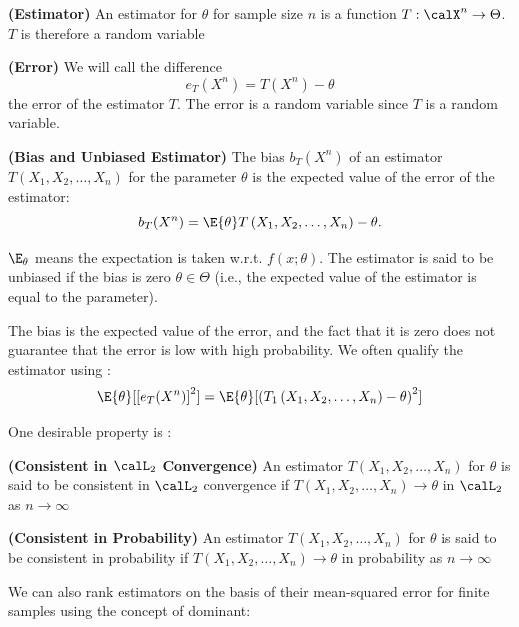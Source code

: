 \documentclass{article}
\newcommand{\bfs}[1]{\textbf{({#1})}}
\begin{document}
\begin{defa}{\bfs{Estimator}}
An estimator for $\theta$ for sample size $n$ is a function $T: \calX^{n} \rightarrow \Theta$. $T$ is therefore a random variable
\end{defa} 

\begin{defa}{\bfs{Error}}
We will call the difference $$e_T(X^n) = T(X^n)-\theta$$ the error of the estimator $T$. The error is a random variable since $T$ is a random variable.
\end{defa} 

\begin{defa}{\bfs{Bias and Unbiased Estimator}}
The bias $b_T(X^n)$ of an estimator $T\left(X_{1}, X_{2}, \ldots, X_{n}\right)$ for the parameter $\theta$ is the expected value of the error of the estimator:
$$b_T(X^n)=\E{\theta} T\left(X_{1}, X_{2}, \ldots, X_{n}\right)-\theta.$$

 $\E_{\theta}$ means the expectation is taken w.r.t. $f(x ; \theta)$. The estimator is said to be unbiased if the bias is zero  $\theta \in \Theta$ (i.e., the expected value of the estimator is equal to the parameter).
\end{defa} 


The bias is the expected value of the error, and the fact that it is zero does not guarantee that the error is low with high probability. We often qualify the estimator using :
$$\E{\theta}[[e_T(X^n)]^2] = \E{\theta}[\left(T_{1}\left(X_{1}, X_{2}, \ldots, X_{n}\right)-\theta\right)^{2}]$$

One desirable  property is :

\begin{defa}{\bfs{Consistent in $\calL_2$ Convergence}}
An estimator $T\left(X_{1}, X_{2}, \ldots, X_{n}\right)$ for $\theta$ is said to be consistent in $\calL_2$ convergence if $T\left(X_{1}, X_{2}, \ldots, X_{n}\right) \rightarrow \theta$ in $\calL_2$ as $n \rightarrow \infty$
\end{defa}

\begin{defa}{\bfs{Consistent in Probability}}
An estimator $T\left(X_{1}, X_{2}, \ldots, X_{n}\right)$ for $\theta$ is said to be consistent in probability if $T\left(X_{1}, X_{2}, \ldots, X_{n}\right) \rightarrow \theta$ in probability as $n \rightarrow \infty$
\end{defa}

We can also  rank estimators on the basis of their mean-squared error for finite samples using the concept of dominant:
\end{document}
